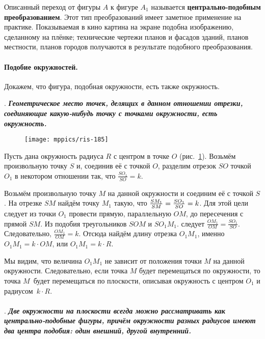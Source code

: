 {\sloppy 
Описанный переход от фигуры $A$ к фигуре $A_1$ называется \textbf{центрально-подобным преобразованием}. 
Этот тип преобразований имеет заметное применение на практике.
Показываемая в кино картина на экране подобна изображению, сделанному на плёнке;
технические чертежи планов и фасадов зданий, планов местности, планов городов
получаются в результате подобного преобразования.

}

{\sloppy

\paragraph{Подобие окружностей.}\label{1938/178}
Докажем, что фигура, подобная окружности, есть также окружность.

}

\smallskip

.
\textbf{\emph{Геометрическое место точек, делящих в данном отношении отрезки, соединяющие какую-нибудь точку с точками окружности, есть окружность.}}


\begin{figure}[h]
\centering
\texttt{[image: mppics/ris-185]}
\caption{}\label{1938/ris-185}
\end{figure}

Пусть дана окружность радиуса $R$ с центром в точке $O$ (рис.~\ref{1938/ris-185}).
Возьмём произвольную точку $S$ и, соединив её с точкой $O$, разделим отрезок $SO$ точкой $O_1$ в некотором отношении так, что $\frac{SO_1}{SO}= k$.

Возьмём произвольную точку $M$ на данной окружности и соединим её с точкой $S$.
На отрезке $SM$ найдём точку $M_1$ такую, что $\frac{SM_1}{SM}\z=\frac{SO_1}{SO}= k$.
Для этой цели следует из точки $O_1$ провести прямую, параллельную $OM$, до пересечения с прямой $SM$.
Из подобия треугольников $SOM$ и $SO_1M_1$.
следует $\frac{OM_1}{OM}=\frac{SO_1}{SO}$.
Следовательно, $\frac{OM_1}{OM}=k$.
Отсюда найдём длину отрезка $O_1M_1$, именно $O_1M_1=k\cdot OM$, или $O_1M_1=k\cdot R$.

Мы видим, что величина $O_1M_1$ не зависит от положения точки $M$ на данной окружности.
Следовательно, если точка $M$ будет перемещаться по окружности, то точка $M$\ будет перемещаться по плоскости, описывая окружность с центром $O_1$ и радиусом~$k\cdot R$.

\paragraph{}\label{1938/179}
.
\textbf{\emph{Две окружности на плоскости всегда можно рассматривать как центрально-подобные фигуры, причём окружности разных радиусов имеют два центра подобия:
один внешний, другой внутренний.}} 

